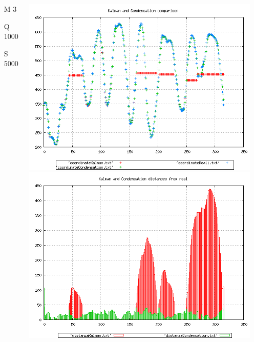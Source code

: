 \documentclass{beamer}
\begin{document}
{\begin{columns}
\begin{scriptsize}
\begin{itemize}
\item [M]3
\item [Q]1000
\item [S]5000
\end{itemize}
\end{scriptsize}
\includegraphics[scale=0.1]{../esperimenti/movie12/mod_3-Q_1000-S_5000/plot.png}\\
\includegraphics[scale=0.1]{../esperimenti/movie12/mod_3-Q_1000-S_5000/plot-distances.png}


\end{columns}}
\end{document}

